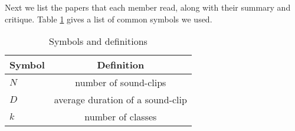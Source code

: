 Next we list the papers that each member read,
along with their summary and critique.
Table \ref{tab:symbols} gives a list of common symbols we used.

\begin{table}[htb]
\begin{center} 
\begin{tabular}{|l | c | } \hline \hline 
Symbol & Definition \\ \hline
$N$ & number of sound-clips \\
$D$ & average duration of a sound-clip \\
$k$  & number of classes \\ \hline
\end{tabular} 
\end{center} 
\caption{Symbols and definitions}
\label{tab:symbols} 
 \end{table} 



